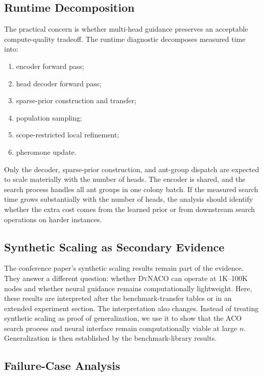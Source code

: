 \documentclass[11pt]{article}
\newcommand{\DyNACO}{\textsc{DyNACO}}
\begin{document}
\subsection{Runtime Decomposition}
\label{sec:runtime-decomp}

The practical concern is whether multi-head guidance preserves an acceptable compute-quality tradeoff.
The runtime diagnostic decomposes measured time into:
\begin{enumerate}
    \item encoder forward pass;
    \item head decoder forward pass;
    \item sparse-prior construction and transfer;
    \item population sampling;
    \item scope-restricted local refinement;
    \item pheromone update.
\end{enumerate}
Only the decoder, sparse-prior construction, and ant-group dispatch are expected to scale materially with the number of heads.
The encoder is shared, and the search process handles all ant groups in one colony batch.
If the measured search time grows substantially with the number of heads, the analysis should identify whether the extra cost comes from the learned prior or from downstream search operations on harder instances.

\subsection{Synthetic Scaling as Secondary Evidence}
\label{sec:synthetic-secondary}

The conference paper's synthetic scaling results remain part of the evidence.
They answer a different question: whether \DyNACO{} can operate at 1K--100K nodes and whether neural guidance remains computationally lightweight.
Here, these results are interpreted after the benchmark-transfer tables or in an extended experiment section.
The interpretation also changes.
Instead of treating synthetic scaling as proof of generalization, we use it to show that the ACO search process and neural interface remain computationally viable at large $n$.
Generalization is then established by the benchmark-library results.

\subsection{Failure-Case Analysis}
\label{sec:failure-cases}
\end{document}
